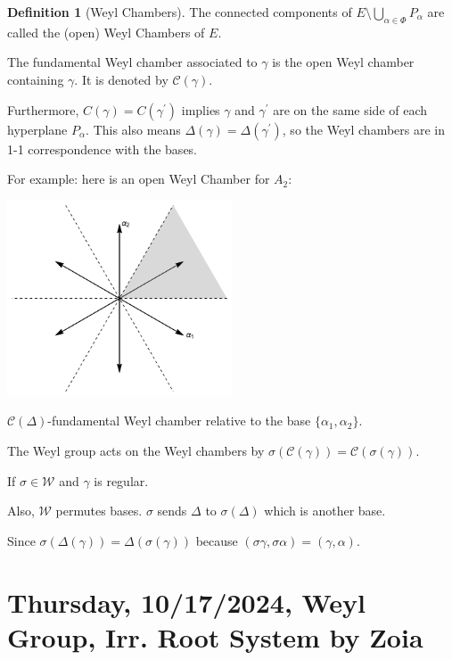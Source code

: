 \documentclass{article}
\theoremstyle{definition}
\newtheorem*{definition}{Definition}
\begin{document}
\begin{definition}
    [Weyl Chambers]
    The connected components of \(E \setminus \bigcup_{\alpha \in \Phi}^{} P_\alpha\) are called the (open) Weyl Chambers of \(E\).
    
    The fundamental Weyl chamber associated to \(\gamma\) is the open Weyl chamber containing \(\gamma\). It is denoted by \(\mathcal{C}(\gamma)\).
    
    Furthermore, \(C(\gamma) = C(\gamma ^{\prime})\) implies \(\gamma\) and \(\gamma ^{\prime} \) are on the same side of each hyperplane \(P_\alpha\). This also means \(\Delta (\gamma) = \Delta (\gamma ^{\prime} )\), so the Weyl chambers are in 1-1 correspondence with the bases.
\end{definition}

For example: here is an open Weyl Chamber for \(A_2\):

\begin{center}
    \includegraphics[width=0.5\textwidth]{img/Weyl_chambers_for_A2}

    \(\mathcal{C}(\Delta)\)-fundamental Weyl chamber relative to the base \(\{ \alpha_1, \alpha_2 \}\). 
\end{center}

The Weyl group acts on the Weyl chambers by \(\sigma (\mathcal{C}(\gamma)) = \mathcal{C}(\sigma(\gamma))\). 

If \(\sigma \in \mathcal{W}\) and \(\gamma\) is regular.

Also, \(\mathcal{W}\) permutes bases. \(\sigma\) sends \(\Delta\) to \(\sigma(\Delta)\) which is another base.

Since \(\sigma(\Delta (\gamma)) = \Delta (\sigma (\gamma))\) because \((\sigma \gamma , \sigma \alpha ) = (\gamma , \alpha)\).

\section{Thursday, 10/17/2024, Weyl Group, Irr. Root System by Zoia}
\end{document}
